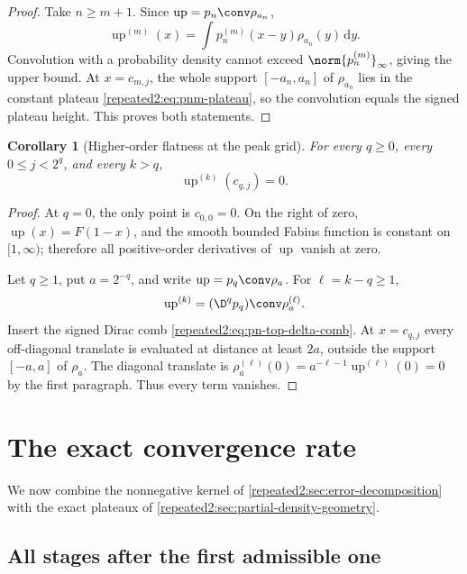 \documentclass[11pt,oneside]{article}
\newtheorem{corollary}[theorem]{Corollary}
\theoremstyle{definition}
\theoremstyle{remark}
\newcommand{\Up}{\operatorname{up}}
\newcommand{\dd}{\,\mathrm d}
\begin{document}
\begin{proof}
Take $n\ge m+1$.  Since $\Up=p_n\conv\rho_{a_n}$,
\[
 \Up^{(m)}(x)=\int p_n^{(m)}(x-y)\rho_{a_n}(y)\dd y.
\]
Convolution with a probability density cannot exceed
$\norm{p_n^{(m)}}_\infty$, giving the upper bound.  At $x=c_{m,j}$, the whole support
$[-a_n,a_n]$ of $\rho_{a_n}$ lies in the constant plateau
\eqref{repeated2:eq:pnm-plateau}, so the convolution equals the signed plateau height.  This proves
both statements.
\end{proof}

\begin{corollary}[Higher-order flatness at the peak grid]
\label{repeated2:cor:higher-flatness-grid}
For every $q\ge0$, every $0\le j<2^q$, and every $k>q$,
\begin{equation}
 \Up^{(k)}(c_{q,j})=0.
 \label{repeated2:eq:higher-flatness-grid}
\end{equation}
\end{corollary}

\begin{proof}
At $q=0$, the only point is $c_{0,0}=0$.  On the right of zero,
$\Up(x)=F(1-x)$, and the smooth bounded Fabius function is constant on $[1,\infty)$;
therefore all positive-order derivatives of $\Up$ vanish at zero.

Let $q\ge1$, put $a=2^{-q}$, and write $\Up=p_q\conv\rho_a$.  For
$\ell=k-q\ge1$, 
\[
 \Up^{(k)}=(\D^q p_q)\conv\rho_a^{(\ell)}.
\]
Insert the signed Dirac comb \eqref{repeated2:eq:pn-top-delta-comb}.  At $x=c_{q,j}$ every
off-diagonal translate is evaluated at distance at least $2a$, outside the support
$[-a,a]$ of $\rho_a$.  The diagonal translate is
$\rho_a^{(\ell)}(0)=a^{-\ell-1}\Up^{(\ell)}(0)=0$ by the first paragraph.
Thus every term vanishes.
\end{proof}

\section{The exact convergence rate}
\label{repeated2:sec:exact-rate}

We now combine the nonnegative kernel of \cref{repeated2:sec:error-decomposition} with the exact
plateaux of \cref{repeated2:sec:partial-density-geometry}.

\subsection{All stages after the first admissible one}
\end{document}
